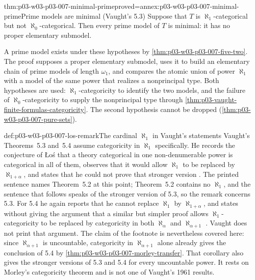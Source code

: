 \begin{hbtheorem}{thm:p03-w03-p03-007-minimal-prime}{proved=annex:p03-w03-p03-007-minimal-prime}{Prime models are minimal (Vaught's 5.3)}
Suppose that \(T\) is \(\aleph_1\)-categorical but not
\(\aleph_0\)-categorical. Then every prime model of \(T\) is minimal: it has
no proper elementary submodel.
\end{hbtheorem}

A prime model exists under these hypotheses by
\cref{thm:p03-w03-p03-007-five-two}. The proof supposes a proper elementary
submodel, uses it to build an elementary chain of prime models of length
\(\omega_1\), and compares the atomic union of power \(\aleph_1\) with a model
of the same power that realizes a nonprincipal type. Both hypotheses are
used: \(\aleph_1\)-categoricity to identify the two models, and the failure of
\(\aleph_0\)-categoricity to supply the nonprincipal type through
\cref{thm:p03-vaught-finite-formulas-categoricity}. The second hypothesis
cannot be dropped (\cref{thm:p03-w03-p03-007-pure-sets}).

\begin{hbwarning}{def:p03-w03-p03-007-los-remark}{The cardinal \(\aleph_1\) in Vaught's statements}
Vaught's Theorems~5.3 and~5.4 assume categoricity in \(\aleph_1\)
specifically. He records the conjecture of Łoś that a theory categorical in
one non-denumerable power is categorical in all of them, observes that it
would allow \(\aleph_1\) to be replaced by \(\aleph_{1+\alpha}\), and states
that he could not prove that stronger version \cite[p.~316]{Vaught1961}.
The printed sentence names Theorem~5.2 at this point; Theorem~5.2 contains
no \(\aleph_1\), and the sentence that follows speaks of the stronger version
of 5.3, so the remark concerns 5.3. For 5.4 he again reports that he cannot
replace \(\aleph_1\) by \(\aleph_{1+\alpha}\), and states without giving the
argument that a similar but simpler proof allows \(\aleph_1\)-categoricity to
be replaced by categoricity in both \(\aleph_\alpha\) and \(\aleph_{\alpha+1}\)
\cite[p.~318, n.~22]{Vaught1961}. Vaught does not print that argument. The
claim of the footnote is nevertheless covered here: since
\(\aleph_{\alpha+1}\) is uncountable, categoricity in \(\aleph_{\alpha+1}\)
alone already gives the conclusion of 5.4 by
\cref{thm:p03-w03-p03-007-morley-transfer}. That corollary also gives the
stronger versions of 5.3 and 5.4 for every uncountable power. It rests on
Morley's categoricity theorem and is not one of Vaught's 1961 results.
\end{hbwarning}


